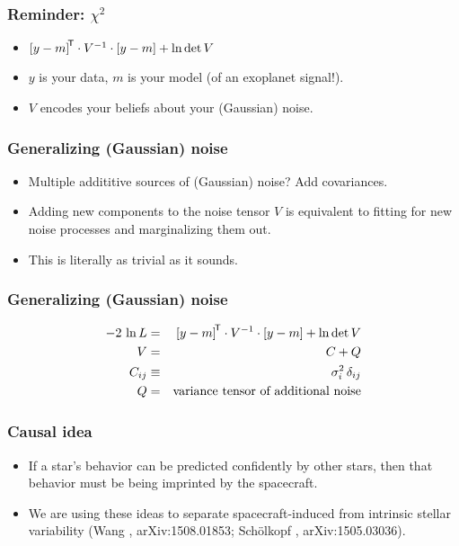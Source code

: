 \documentclass[pdftex]{beamer}
\begin{document}
\begin{frame}
  \frametitle{Reminder: $\chi^2$}
  \begin{itemize}
  \item ${[y - m]}^{\mathsf{\!T}}\cdot V^{-1}\cdot [y - m] + \ln\det V$
  \item $y$ is your data, $m$ is your model (of an exoplanet signal!).
  \item $V$ encodes your beliefs about your (Gaussian) noise.
  \end{itemize}
\end{frame}

\begin{frame}
  \frametitle{Generalizing (Gaussian) noise}
  \begin{itemize}
  \item Multiple addititive sources of (Gaussian) noise? Add covariances.
  \item Adding new components to the noise tensor $V$ is
    equivalent to fitting for new noise processes and marginalizing
    them out.
  \item This is literally as trivial as it sounds.
  \end{itemize}
\end{frame}

\begin{frame}
  \frametitle{Generalizing (Gaussian) noise}
  \begin{eqnarray}
    -2\,\ln L &=& {[y - m]}^{\mathsf{\!T}}\cdot V^{-1}\cdot [y - m] + \ln\det V
    \nonumber \\
    V &=& C + Q
    \nonumber \\
    C_{ij} &\equiv& \sigma_i^2\,\delta_{ij}
    \nonumber \\
    Q &=& \mbox{variance tensor of additional noise}
    \nonumber
  \end{eqnarray}
\end{frame}

\begin{frame}
  \frametitle{Causal idea}
  \begin{itemize}
  \item If a star's behavior can be predicted confidently by
    other stars, then that behavior must be being imprinted by
    the spacecraft.
  \item We are using these ideas to separate spacecraft-induced from
    intrinsic stellar variability {\footnotesize (Wang \etal, arXiv:1508.01853;
    Sch\"olkopf \etal, arXiv:1505.03036)}.
  \end{itemize}
\end{frame}
\end{document}
